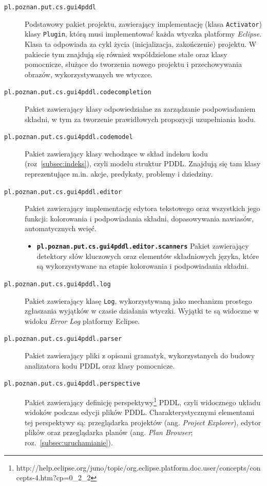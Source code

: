 \begin{description}
\item [\texttt{pl.poznan.put.cs.gui4pddl}] Podstawowy pakiet projektu, zawierający implementację (klasa \texttt{Activator}) klasy \texttt{Plugin}, którą musi implementować każda wtyczka platformy \emph{Eclipse}. Klasa ta odpowiada za cykl życia (inicjalizacja, zakończenie) projektu. W pakiecie tym znajdują się również współdzielone stałe oraz klasy pomocnicze, służące do tworzenia nowego projektu i przechowywania obrazów, wykorzystywanych we wtyczce.
\item [\texttt{pl.poznan.put.cs.gui4pddl.codecompletion}] Pakiet zawierający klasy odpowiedzialne za zarządzanie podpowiadaniem składni, w tym za tworzenie prawidłowych propozycji uzupełniania kodu.
\item [\texttt{pl.poznan.put.cs.gui4pddl.codemodel}] Pakiet zawierający klasy wchodzące w skład indeksu kodu (roz~\ref{subsec:indeks}), czyli modelu struktur PDDL. Znajdują się tam klasy reprezentujące m.in. akcje, predykaty, problemy i dziedziny.
\item [\texttt{pl.poznan.put.cs.gui4pddl.editor}] Pakiet zawierający implementację edytora tekstowego oraz wszystkich jego funkcji: kolorowania i podpowiadania składni, dopasowywania nawiasów, automatycznych wcięć.
\begin{itemize}
\item \texttt{\textbf{pl.poznan.put.cs.gui4pddl.editor.scanners}} Pakiet zawierający detektory słów kluczowych oraz elementów składniowych języka, które są wykorzystywane na etapie kolorowania i podpowiadania składni.
\end{itemize}
\item [\texttt{pl.poznan.put.cs.gui4pddl.log}] Pakiet zawierający klasę \texttt{Log}, wykorzystywaną jako mechanizm prostego zgłaszania wyjątków w czasie działania wtyczki. Wyjątki te są widoczne w widoku \textit{Error Log} platformy Eclipse.
\item [\texttt{pl.poznan.put.cs.gui4pddl.parser}] Pakiet zawierający pliki z opisami gramatyk, wykorzystanych do budowy analizatora kodu PDDL oraz klasy pomocnicze.
\item [\texttt{pl.poznan.put.cs.gui4pddl.perspective}] Pakiet zawierający definicję perspektywy\footnote{http://help.eclipse.org/juno/topic/org.eclipse.platform.doc.user/concepts/concepts-4.htm?cp=0\_2\_2} PDDL, czyli widocznego układu widoków podczas edycji plików PDDL. Charakterystycznymi elementami tej perspektywy są: przeglądarka projektów (ang. \textit{Project Explorer}), edytor plików oraz przeglądarka planów (ang. \textit{Plan Browser}; roz.~\ref{subsec:uruchamianie}).

\end{description}
